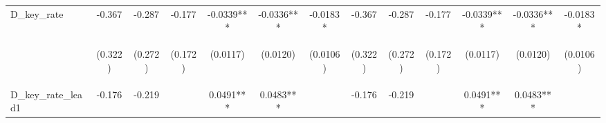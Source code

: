 \documentclass[]{article}
\begin{document}
\begin{center}
\begin{tabular}{lcccccccccccc}
D\_key\_rate & -0.367 & -0.287 & -0.177 & -0.0339*** & -0.0336*** & -0.0183* & -0.367 & -0.287 & -0.177 & -0.0339*** & -0.0336*** & -0.0183* \\
\vspace{4pt} & \begin{footnotesize}(0.322)\end{footnotesize} & \begin{footnotesize}(0.272)\end{footnotesize} & \begin{footnotesize}(0.172)\end{footnotesize} & \begin{footnotesize}(0.0117)\end{footnotesize} & \begin{footnotesize}(0.0120)\end{footnotesize} & \begin{footnotesize}(0.0106)\end{footnotesize} & \begin{footnotesize}(0.322)\end{footnotesize} & \begin{footnotesize}(0.272)\end{footnotesize} & \begin{footnotesize}(0.172)\end{footnotesize} & \begin{footnotesize}(0.0117)\end{footnotesize} & \begin{footnotesize}(0.0120)\end{footnotesize} & \begin{footnotesize}(0.0106)\end{footnotesize} \\
D\_key\_rate\_lead1 & -0.176 & -0.219 &  & 0.0491*** & 0.0483*** &  & -0.176 & -0.219 &  & 0.0491*** & 0.0483*** &  \\

\end{tabular}
\end{center}
\end{document}

